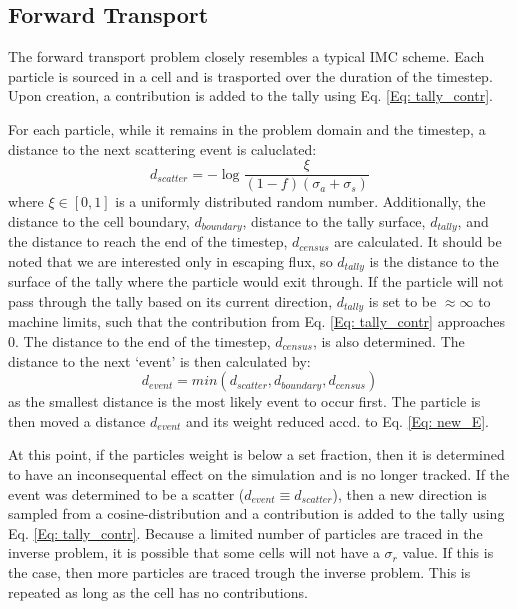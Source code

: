 \subsection{Forward Transport}
The forward transport problem closely resembles a typical IMC scheme. Each particle is sourced in a cell and is trasported over the duration of the timestep. Upon creation, a contribution is added to the tally using Eq. \ref{Eq: tally_contr}. 

For each particle, while it remains in the problem domain and the timestep, a distance to the next scattering event is caluclated:
\begin{equation}
d_{scatter} = -\log{\frac{\xi}{(1 - f)(\sigma_{a} + \sigma_{s})}}
\end{equation}
where $\xi \in [0,1]$ is a uniformly distributed random number. Additionally, the distance to the cell boundary, $d_{boundary}$, distance to the tally surface, $d_{tally}$, and the distance to reach the end of the timestep, $d_{census}$ are calculated. It should be noted that we are interested only in escaping flux, so $d_{tally}$ is the distance to the surface of the tally where the particle would exit through. If the particle will not pass through the tally based on its current direction, $d_{tally}$ is set to be $\approx \infty$ to machine limits, such that the contribution from Eq. \ref{Eq: tally_contr} approaches $0$. The distance to the end of the timestep, $d_{census}$, is also determined. The distance to the next `event' is then calculated by:
\begin{equation}
d_{event} = min(d_{scatter}, d_{boundary}, d_{census})
\end{equation}
as the smallest distance is the most likely event to occur first. The particle is then moved a distance $d_{event}$ and its weight reduced accd. to Eq. \ref{Eq: new_E}. 

At this point, if the particles weight is below a set fraction, then it is determined to have an inconsequental effect on the simulation and is no longer tracked. If the event was determined to be a scatter ($d_{event} \equiv d_{scatter}$), then a new direction is sampled from a cosine-distribution and a contribution is added to the tally using Eq. \ref{Eq: tally_contr}. Because a limited number of particles are traced in the inverse problem, it is possible that some cells will not have a $\sigma_{r}$ value. If this is the case, then more particles are traced trough the inverse problem. This is repeated as long as the cell has no contributions. 

